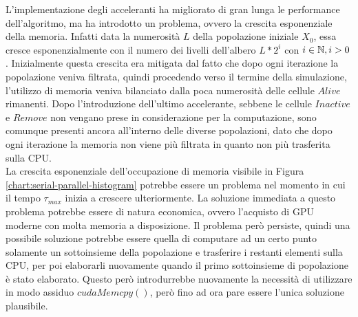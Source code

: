 L'implementazione degli acceleranti ha migliorato di gran lunga le
performance dell'algoritmo, ma ha introdotto un problema, ovvero la crescita
esponenziale della memoria.
Infatti data la numerosità $L$ della popolazione iniziale $X_{0}$, essa cresce
esponenzialmente con il numero dei livelli dell'albero $L * 2^i$ con
$i \in \mathbb{N}, i > 0$. Inizialmente questa crescita era mitigata dal fatto che
dopo ogni iterazione la popolazione veniva filtrata, quindi procedendo verso
il termine della simulazione, l'utilizzo di memoria veniva bilanciato dalla
poca numerosità delle cellule $Alive$ rimanenti.
Dopo l'introduzione dell'ultimo accelerante, sebbene le cellule $Inactive$ e
$Remove$ non vengano prese in considerazione per la computazione, sono
comunque presenti ancora all'interno delle diverse popolazioni, dato che
dopo ogni iterazione la memoria non viene più filtrata in quanto non più
trasferita sulla CPU.
\\
La crescita esponenziale dell'occupazione di memoria visibile in Figura
\ref{chart:serial-parallel-histogram} potrebbe essere un
problema nel momento in cui il tempo $\tau_{max}$ inizia a crescere
ulteriormente. La soluzione immediata a questo problema potrebbe essere di
natura economica, ovvero l'acquisto di GPU moderne con molta memoria a
disposizione. Il problema però persiste, quindi una possibile soluzione
potrebbe essere quella di computare ad un certo punto solamente un sottoinsieme
della popolazione e trasferire i restanti elementi sulla CPU, per poi
elaborarli nuovamente quando il primo sottoinsieme di popolazione è stato
elaborato. Questo però introdurrebbe nuovamente la necessità di utilizzare
in modo assiduo $cudaMemcpy()$, però fino ad ora pare essere l'unica soluzione
plausibile.
